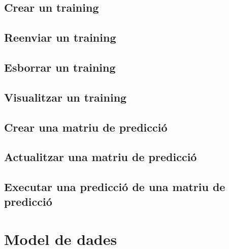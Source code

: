 \subsection{Crear un training}
\subsection{Reenviar un training}
\subsection{Esborrar un training}
\subsection{Visualitzar un training}
\subsection{Crear una matriu de predicci\'{o}}
\subsection{Actualitzar una matriu de predicci\'{o}}
\subsection{Executar una predicci\'{o} de una matriu de predicci\'{o}}

\section{Model de dades}